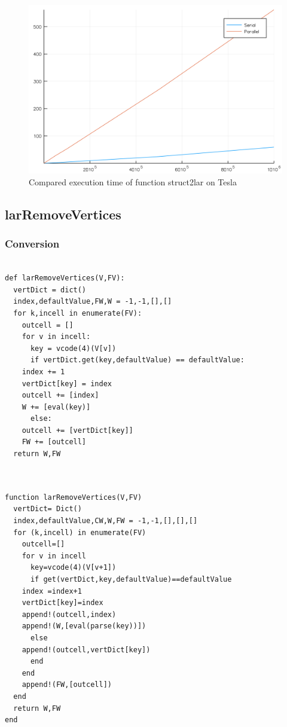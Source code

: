\documentclass[a4paper,12pt]{article}
\begin{document}
\begin{figure}[!h]
\centering
\includegraphics[scale=0.08]{compstruct2lar.png}
\caption{Compared execution time of function struct2lar on Tesla}
\end{figure}


\newpage
\subsection{larRemoveVertices}
\subsubsection{Conversion}

\noindent {}
\begin{Verbatim}[fontsize=\scriptsize]

def larRemoveVertices(V,FV):
  vertDict = dict()
  index,defaultValue,FW,W = -1,-1,[],[]
  for k,incell in enumerate(FV):
    outcell = []
    for v in incell:
      key = vcode(4)(V[v])
      if vertDict.get(key,defaultValue) == defaultValue:
	index += 1
	vertDict[key] = index
	outcell += [index]
	W += [eval(key)]
      else:
	outcell += [vertDict[key]]
    FW += [outcell]
  return W,FW
  
\end{Verbatim}

\noindent {}
\begin{Verbatim}[fontsize=\scriptsize]

function larRemoveVertices(V,FV)
  vertDict= Dict()
  index,defaultValue,CW,W,FW = -1,-1,[],[],[]
  for (k,incell) in enumerate(FV)
    outcell=[]
    for v in incell
      key=vcode(4)(V[v+1])
      if get(vertDict,key,defaultValue)==defaultValue
	index =index+1
	vertDict[key]=index
	append!(outcell,index)
	append!(W,[eval(parse(key))])
      else
	append!(outcell,vertDict[key])
      end
    end
    append!(FW,[outcell])
  end
  return W,FW
end

\end{Verbatim}
\end{document}
